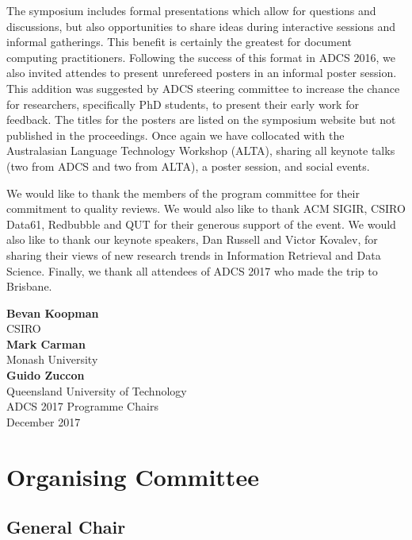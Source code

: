 \documentclass[a4paper]{article}
\begin{document}
The symposium includes formal presentations which allow for questions and
discussions, but also opportunities to share ideas during interactive sessions
and informal gatherings. This benefit is certainly the greatest for document
computing practitioners. Following the success of this format in ADCS 2016, we also invited attendes to present unrefereed posters in an informal poster session. This addition was suggested by ADCS steering committee to increase the chance for researchers, specifically PhD students, to present their early work for feedback. The titles for the posters are listed on the symposium website but not published in the proceedings. Once again we have collocated with the Australasian
Language Technology Workshop (ALTA), sharing all keynote talks (two from ADCS and two from ALTA), a poster session, and social events.

We would like to thank the members of the program committee for their
commitment to quality reviews. We would also like to thank ACM SIGIR, CSIRO Data61, Redbubble and QUT 
 for their generous support of the event. We would
also like to thank our keynote speakers, Dan Russell and Victor Kovalev, for sharing their views of new
research trends in Information Retrieval and Data Science. Finally, we thank all attendees of
ADCS 2017 who made the trip to Brisbane.

\vspace{1cm}

\begin{flushright}\noindent
\textbf{Bevan Koopman}\\
CSIRO \\[.1in]
\textbf{Mark Carman}\\
Monash University\\[.1in]
\textbf{Guido Zuccon}\\
Queensland University of Technology \\[.1in]
ADCS 2017 Programme Chairs\\
December 2017
\end{flushright}

\newpage


\section*{Organising Committee}


\subsection*{General Chair}
\end{document}
